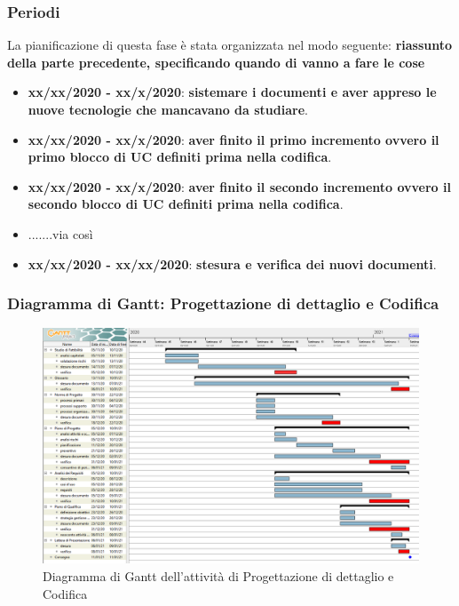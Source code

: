 \subsubsection{Periodi}
La pianificazione di questa fase è stata organizzata nel modo seguente:
\textbf{riassunto della parte precedente, specificando quando di vanno a fare le cose}
\begin{itemize}
\item \textbf{xx/xx/2020 - xx/x/2020}: \textbf{sistemare i documenti e aver appreso le nuove tecnologie che mancavano da studiare}.

\item \textbf{xx/xx/2020 - xx/x/2020}: \textbf{aver finito il primo incremento ovvero il primo blocco di UC definiti prima nella codifica}.

\item \textbf{xx/xx/2020 - xx/x/2020}: \textbf{aver finito il secondo incremento ovvero il secondo blocco di UC definiti prima nella codifica}.

\item .......via così

\item \textbf{xx/xx/2020 - xx/xx/2020}: \textbf{stesura e verifica dei nuovi documenti}.
\end{itemize}

\subsubsection{Diagramma di Gantt: Progettazione di dettaglio e Codifica}
\begin{figure}[h]
	\includegraphics[scale=0.45]{Images/GanttPianificazioneAnalisi.PNG}
	\caption{Diagramma di Gantt dell'attività di Progettazione di dettaglio e Codifica}
\end{figure}